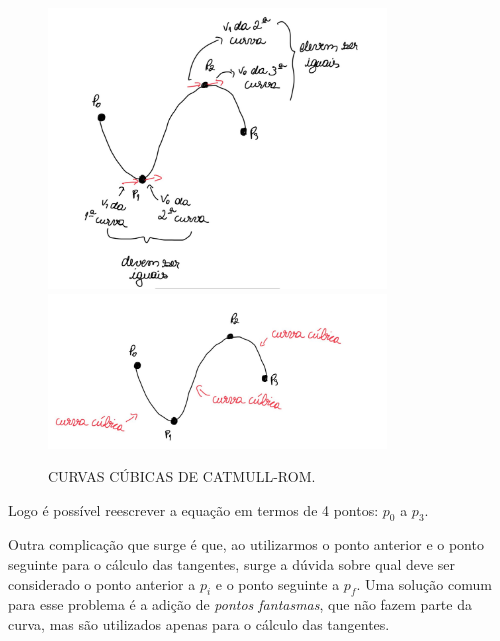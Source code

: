 \begin{figure}[h!]
    \caption{CURVAS CÚBICAS DE CATMULL-ROM.}
    \centering
    \includegraphics[width=0.8\textwidth]{fig/s1.jpg}
    \vspace{0.5em} %
    \includegraphics[width=0.8\textwidth]{fig/s2.jpg}
    \label{fig:spline_tangentes}
\end{figure}

Logo é possível reescrever a equação em termos de 4 pontos: $p_0$ a $p_3$.

Outra complicação que surge é que, ao utilizarmos o ponto anterior e o ponto seguinte para o cálculo das tangentes, surge a dúvida sobre qual deve ser considerado o ponto anterior a $p_i$ e o ponto seguinte a $p_f$. Uma solução comum para esse problema é a adição de \textit{pontos fantasmas}, que não fazem parte da curva, mas são utilizados apenas para o cálculo das tangentes.



